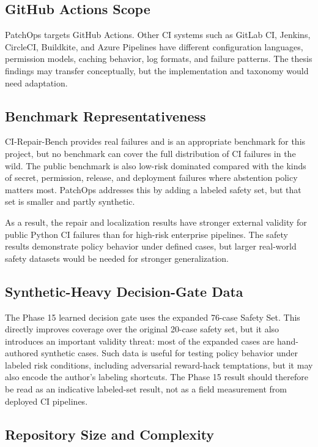 \subsection{GitHub Actions Scope}

PatchOps targets GitHub Actions. Other CI systems such as GitLab CI, Jenkins, CircleCI, Buildkite, and Azure
Pipelines have different configuration languages, permission models, caching behavior, log formats, and failure
patterns. The thesis findings may transfer conceptually, but the implementation and taxonomy would need
adaptation.

\subsection{Benchmark Representativeness}

CI-Repair-Bench provides real failures and is an appropriate benchmark for this project, but no benchmark can
cover the full distribution of CI failures in the wild. The public benchmark is also low-risk dominated compared
with the kinds of secret, permission, release, and deployment failures where abstention policy matters most.
PatchOps addresses this by adding a labeled safety set, but that set is smaller and partly synthetic.

As a result, the repair and localization results have stronger external validity for public Python CI failures
than for high-risk enterprise pipelines. The safety results demonstrate policy behavior under defined cases, but
larger real-world safety datasets would be needed for stronger generalization.

\subsection{Synthetic-Heavy Decision-Gate Data}

The Phase 15 learned decision gate uses the expanded 76-case Safety Set. This directly improves coverage over
the original 20-case safety set, but it also introduces an important validity threat: most of the expanded cases
are hand-authored synthetic cases. Such data is useful for testing policy behavior under labeled risk
conditions, including adversarial reward-hack temptations, but it may also encode the author's labeling
shortcuts. The Phase 15 result should therefore be read as an indicative labeled-set result, not as a field
measurement from deployed CI pipelines.

\subsection{Repository Size and Complexity}

